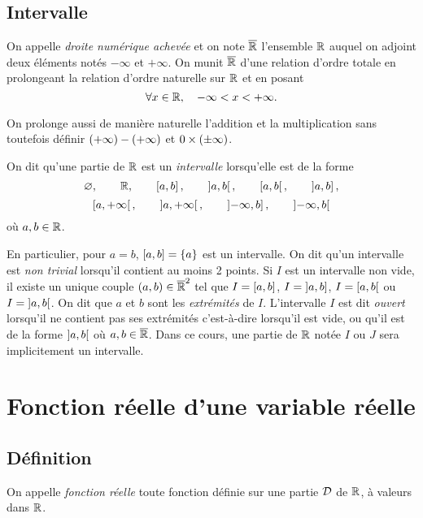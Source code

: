 \documentclass{magnolia}
\begin{document}
\subsection{Intervalle}


\begin{definition}[utile=-3]
On appelle \emph{droite numérique achevée} et on note $\overline{\mathbb{R}}$ l'ensemble $\mathbb{R}$ auquel
on adjoint deux éléments notés $-\infty$ et $+\infty$. On munit $\overline{\mathbb{R}}$ d'une
relation d'ordre totale en prolongeant la relation d'ordre naturelle sur $\mathbb{R}$
et en posant
\[\forall x\in\mathbb{R} ,\quad -\infty<x<+\infty.\]
\end{definition}

\begin{remarqueUnique}
\remarque On prolonge aussi de manière naturelle l'addition et la
  multiplication sans toutefois définir
  $\left(+\infty\right)-\left(+\infty\right)$ et $0\times\left(\pm \infty\right)$.
\end{remarqueUnique}

\begin{definition}
On dit qu'une partie de $\mathbb{R}$ est un \emph{intervalle} lorsqu'elle est de la forme
\[\varnothing, \qquad \mathbb{R}, \qquad \left[a,b\right], \qquad \left]a,b\right[, \qquad 
  \left[a,b\right[, \qquad \left]a,b\right],\]
\[\left[a,+\infty\right[, \qquad \left]a,+\infty\right[, \qquad \left]-\infty,b\right],
  \qquad \left]-\infty,b\right[\]
où $a,b\in\mathbb{R}$.
\end{definition}

\begin{remarques}
\remarque En particulier, pour $a=b$, $\left[a,b\right]=\left\{a\right\}$ est un intervalle.
  On dit qu'un intervalle est \emph{non trivial} lorsqu'il contient au moins 2 points.
\remarque Si $I$ est un intervalle non vide, il existe un unique couple $(a,b)\in\overline{\mathbb{R}}^2$ tel
  que $I=\left[a,b\right]$, $I=\left]a,b\right]$, $I=\left[a,b\right[$ ou
  $I=\left]a,b\right[$. On dit que $a$ et $b$ sont les
  \emph{extrémités} de $I$. L'intervalle $I$ est dit \emph{ouvert} lorsqu'il ne contient pas ses extrémités
  c'est-à-dire lorsqu'il est vide, ou qu'il est de la forme $\left]a,b\right[$ où $a,b\in\overline{\mathbb{R}}$.
\remarque Dans ce cours, une partie de $\mathbb{R}$ notée $I$ ou $J$ sera implicitement un intervalle.
\end{remarques}

\section{Fonction réelle d'une variable réelle}
\subsection{Définition}
\begin{definition}[utile=-3]
On appelle \emph{fonction réelle} toute fonction définie sur une partie $\mathcal{D}$ de $\mathbb{R}$,
à valeurs dans $\mathbb{R}$.
\end{definition}
\end{document}
